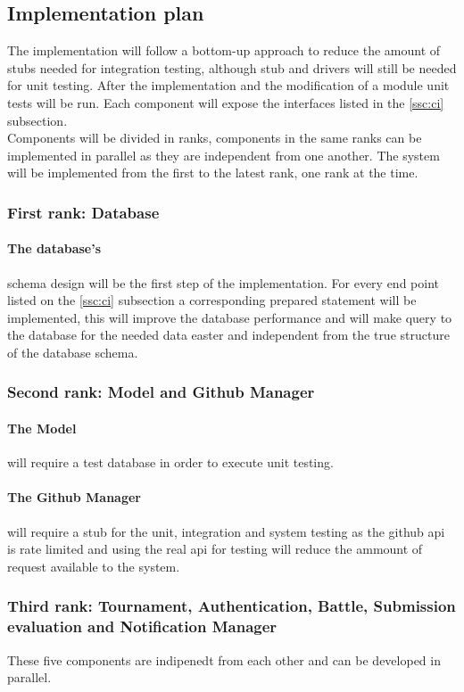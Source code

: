 \documentclass{article}
\begin{document}
\subsection{Implementation plan}
The implementation will follow a bottom-up approach to reduce the amount of stubs needed for integration testing, although stub and drivers will still be needed for unit testing. After the implementation and the modification of a module unit tests will be run. Each component will expose the interfaces listed in the \ref{ssc:ci} subsection.\\

Components will be divided in ranks, components in the same ranks can be implemented in parallel as they are independent from one another. The system will be implemented from the first to the latest rank, one rank at the time.

\subsubsection{First rank: Database}
\paragraph{The database's} schema design will be the first step of the implementation. For every end point listed on the \ref{ssc:ci} subsection a corresponding prepared statement will be implemented, this will improve the database performance and will make query to the database for the needed data easter and independent from the true structure of the database schema.

\subsubsection{Second rank: Model and Github Manager}
\paragraph{The Model} will require a test database in order to execute unit testing.
\paragraph{The Github Manager} will require a stub for the unit, integration and system testing as the github api is rate limited and using the real api for testing will reduce the ammount of request available to the system.

\subsubsection{Third rank: Tournament, Authentication, Battle, Submission evaluation and Notification Manager}
These five components are indipenedt from each other and can be developed in parallel.
\end{document}
